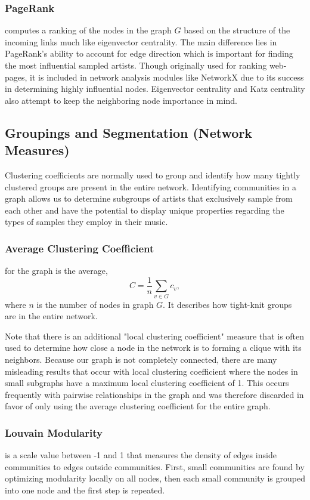 \documentclass[pageno]{jpaper}
\begin{document}
\subsubsection{PageRank}
computes a ranking of the nodes in the graph $G$ based on the structure of the incoming links much like eigenvector centrality. The main difference lies in PageRank's ability to account for edge direction which is important for finding the most influential sampled artists. Though originally used for ranking web-pages, it is included in network analysis modules like NetworkX due to its success in determining highly influential nodes. Eigenvector centrality and Katz centrality also attempt to keep the neighboring node importance in mind.
\subsection{Groupings and Segmentation (Network Measures)}
Clustering coefficients are normally used to group and identify how many tightly clustered groups are present in the entire network. Identifying communities in a graph allows us to determine subgroups of artists that exclusively sample from each other and have the potential to display unique properties regarding the types of samples they employ in their music.
\subsubsection{Average Clustering Coefficient}
for the graph is the average, 
\begin{equation}
C = \frac{1}{n}\sum_{v \in G} c_v,
\end{equation} where $n$ is the number of nodes in graph $G$. It describes how tight-knit groups are in the entire network.

Note that there is an additional "local clustering coefficient" measure that is often used to determine how close a node in the network is to forming a clique with its neighbors. Because our graph is not completely connected, there are many misleading results that occur with local clustering coefficient where the nodes in small subgraphs have a maximum local clustering coefficient of 1. This occurs frequently with pairwise relationships in the graph and was therefore discarded in favor of only using the average clustering coefficient for the entire graph.
\subsubsection{Louvain Modularity}
is a scale value between -1 and 1 that measures the density of edges inside communities to edges outside communities. First, small communities are found by optimizing modularity locally on all nodes, then each small community is grouped into one node and the first step is repeated.
\end{document}
